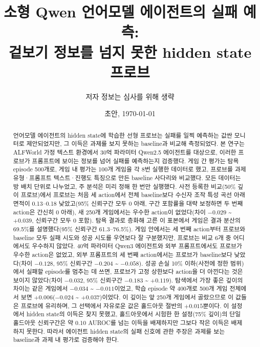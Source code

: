 \documentclass[11pt]{article}
\title{소형 Qwen 언어모델 에이전트의 실패 예측:\\겉보기 정보를 넘지 못한 hidden state 프로브}
\author{저자 정보는 심사를 위해 생략}
\date{초안, \today}
\begin{document}
\maketitle

\begin{abstract}
언어모델 에이전트의 hidden state에 학습한 선형 프로브는 실패를 일찍 예측하는 값싼 모니터로 제안되었지만, 그 이득은 과제를 보지 못하는 baseline과 비교해 측정되었다.
본 연구는 ALFWorld 가정 텍스트 환경에서 30억 파라미터 Qwen2.5 에이전트를 대상으로, 이러한 프로브가 프롬프트에 보이는 정보를 넘어 실패를 예측하는지 검증했다.
게임 간 평가는 탐욕 episode 500개로, 게임 내 평가는 100개 게임을 각 8번 실행한 데이터로 했고, 프로브를 과제 유형·프롬프트 텍스트·진행도 특징으로 만든 baseline 사다리와 비교했다.
모든 데이터는 방 배치 단위로 나누었고, 주 분석은 미리 정해 한 번만 실행했다.
사전 등록한 비교(50\% 깊이 프로브)에서 프로브는 처음 세 action에서 전체 baseline보다 수신자 조작 특성 곡선 아래 면적이 0.13--0.18 낮았고(95\% 신뢰구간 모두 0 아래, 구간 포함률을 대략 보정하면 두 번째 action은 간신히 0 아래), 새 250개 게임에서는 우수한 action이 없었다(차이 $-0.029$ \textasciitilde{} $+0.039$, 신뢰구간 모두 0 포함).
탐욕 결과로 층화해 고른 이 표본에서 게임은 결과 분산의 69.5\%를 설명했다(95\% 신뢰구간 61.3--76.5\%). 게임 안에서는 세 번째 action부터 프로브와 baseline 모두 실패 시도와 성공 시도를 우연보다 잘 구분했지만, 프로브는 비교 6개 중 어디에서도 우수하지 않았다.
40억 파라미터 Qwen3 에이전트와 외부 프롬프트에서도 프로브가 우수한 action은 없었고, 외부 프롬프트의 세 번째 action에서는 프로브가 baseline보다 낮았다(차이 $-0.128$, 95\% 신뢰구간 $-0.204$ \textasciitilde{} $-0.058$).
성공 손실 10\% 이하(사전에 정한 범위)에서 실패할 episode를 멈추는 데 쓰면, 프로브가 고정 상한보다 action을 더 아낀다는 것은 보이지 않았다(차이 $-0.032$, 95\% 신뢰구간 $-0.183$ \textasciitilde{} $+0.119$).
탐색에서 가장 좋은 깊이의 차이는 같은 게임에서 $-0.034$ \textasciitilde{} $-0.011$이었고, 학습 episode 약 400개로 500개 게임 전체에서 보면 $+0.006$($-0.024$ \textasciitilde{} $+0.037$)이었다. 이 깊이는 앞 250개 게임에서 골랐으므로 이 값들은 프로브에 유리하며, 그 선택에서 자유로운 값은 홀드아웃 절반의 $+0.015$뿐이다. 이 설정에서 hidden state의 이득은 찾지 못했고, 홀드아웃에서 시험한 한 설정(75\% 깊이)의 단일 홀드아웃 신뢰구간은 약 0.10 AUROC를 넘는 이득을 배제하지만 그보다 작은 이득은 배제하지 못한다. 따라서 에이전트 hidden state의 실패 신호에 관한 주장은 과제를 보는 baseline과 과제 내 평가로 검증해야 한다.
\end{abstract}
\end{document}
